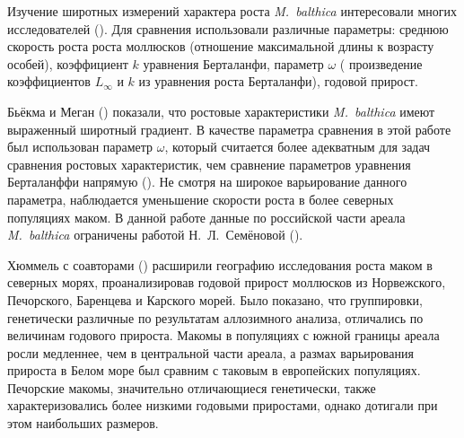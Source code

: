 

\afterpage{\clearpage}

\par\bigskip

Изучение широтных измерений характера роста {\it M.~balthica} интересовали многих исследователей (\cite{Gilbert_1973, Bachelet_1980, Beukema_Meehan_1985, Wenne_Klusek_1985, Hummel_et_al_1998}).
Для сравнения использовали различные параметры: среднюю скорость роста роста моллюсков (отношение максимальной длины к возрасту особей), коэффициент $k$ уравнения Берталанфи, параметр $\omega$ ( произведение коэффициентов $L_{\infty}$ и $k$ из уравнения роста Берталанфи), годовой прирост.

Бьёкма и Меган (\cite{Beukema_Meehan_1985}) показали, что ростовые характеристики {\it M.~balthica} имеют выраженный широтный градиент.
В качестве параметра сравнения в этой работе был использован параметр $\omega$, который считается более адекватным для задач сравнения ростовых характеристик, чем сравнение параметров уравнения Берталанффи напрямую (\cite{Appeldoorn_1983}). 
Не смотря на широкое варьирование данного параметра, наблюдается уменьшение скорости роста в более северных популяциях маком.
В данной работе данные по российской части ареала {\it M.~balthica} ограничены работой Н.~Л.~Семёновой (\cite*{Semenova_1970}).

Хюммель с соавторами (\cite{Hummel_et_al_1998}) расширили географию исследования роста маком в северных морях, проанализировав годовой прирост моллюсков из Норвежского, Печорского, Баренцева и Карского морей.
Было показано, что группировки, генетически различные по результатам аллозимного анализа, отличались по величинам годового прироста. 
Макомы в популяциях с южной границы ареала росли медленнее, чем в центральной части ареала, а размах варьирования прироста в Белом море был сравним с таковым в европейских популяциях.
Печорские макомы, значительно отличающиеся генетически, также характеризовались более низкими годовыми приростами, однако дотигали при этом наибольших размеров.

